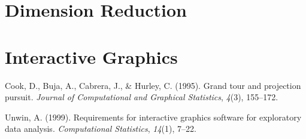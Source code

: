 \documentclass[print]{nuthesis}
\newlength{\cslhangindent}
\newenvironment{CSLReferences}[2]%
{\setlength{\parindent}{0pt}%
\everypar{\setlength{\hangindent}{\cslhangindent}}\ignorespaces}%
{\par}
\begin{document}
\hypertarget{dimension-reduction-1}{%
\section{Dimension Reduction}\label{dimension-reduction-1}}

\hypertarget{interactive-graphics-1}{%
\section{Interactive Graphics}\label{interactive-graphics-1}}

\hypertarget{refs}{}
\begin{CSLReferences}{1}{0}
\leavevmode{}%
Cook, D., Buja, A., Cabrera, J., \& Hurley, C. (1995). Grand tour and projection pursuit. \emph{Journal of Computational and Graphical Statistics}, \emph{4}(3), 155--172.

\leavevmode{}%
Unwin, A. (1999). Requirements for interactive graphics software for exploratory data analysis. \emph{Computational Statistics}, \emph{14}(1), 7--22.

\end{CSLReferences}


\backmatter

% 






\end{document}
